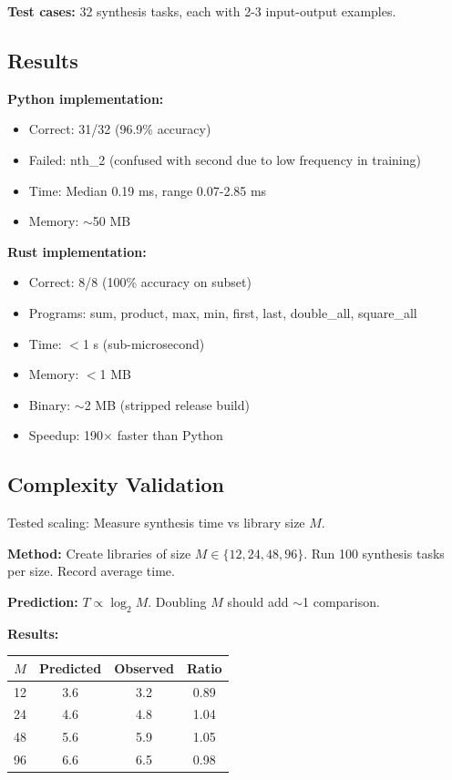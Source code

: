 \documentclass[twocolumn,10pt]{article}
\theoremstyle{definition}
\theoremstyle{remark}
\begin{document}
\textbf{Test cases:} 32 synthesis tasks, each with 2-3 input-output examples.

\subsection{Results}

\textbf{Python implementation:}
\begin{itemize}
\item Correct: 31/32 (96.9\% accuracy)
\item Failed: nth\_2 (confused with second due to low frequency in training)
\item Time: Median 0.19 ms, range 0.07-2.85 ms
\item Memory: $\sim$50 MB
\end{itemize}

\textbf{Rust implementation:}
\begin{itemize}
\item Correct: 8/8 (100\% accuracy on subset)
\item Programs: sum, product, max, min, first, last, double\_all, square\_all
\item Time: $<$1 \textmu s (sub-microsecond)
\item Memory: $<$1 MB
\item Binary: $\sim$2 MB (stripped release build)
\item Speedup: 190$\times$ faster than Python
\end{itemize}

\subsection{Complexity Validation}

Tested scaling: Measure synthesis time vs library size $M$.

\textbf{Method:} Create libraries of size $M \in \{12, 24, 48, 96\}$. Run 100 synthesis tasks per size. Record average time.

\textbf{Prediction:} $T \propto \log_2 M$. Doubling $M$ should add $\sim$1 comparison.

\textbf{Results:}
\begin{center}
\begin{tabular}{cccc}
\hline
$M$ & Predicted & Observed & Ratio \\
\hline
12 & 3.6 & 3.2 & 0.89 \\
24 & 4.6 & 4.8 & 1.04 \\
48 & 5.6 & 5.9 & 1.05 \\
96 & 6.6 & 6.5 & 0.98 \\
\hline
\end{tabular}
\end{center}
\end{document}
